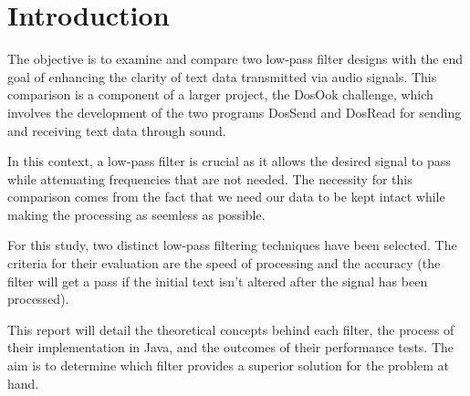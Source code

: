 \chapter{Introduction}

The objective is to examine and compare two low-pass filter designs with the end goal of enhancing the clarity of text data transmitted via audio signals. This comparison is a component of a larger project, the DosOok challenge, which involves the development of the two programs DosSend and DosRead for sending and receiving text data through sound.

In this context, a low-pass filter is crucial as it allows the desired signal to pass while attenuating frequencies that are not needed. The necessity for this comparison comes from the fact that we need our data to be kept intact while making the processing as seemless as possible.

For this study, two distinct low-pass filtering techniques have been selected. The criteria for their evaluation are the speed of processing and the accuracy (the filter will get a pass if the initial text isn't altered after the signal has been processed).

This report will detail the theoretical concepts behind each filter, the process of their implementation in Java, and the outcomes of their performance tests. The aim is to determine which filter provides a superior solution for the problem at hand.